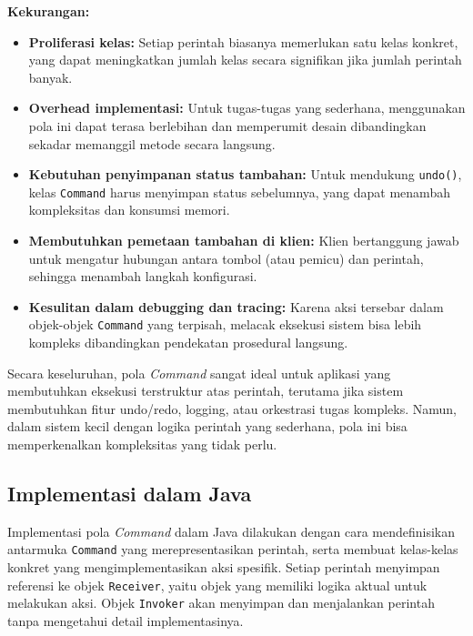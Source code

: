 \textbf{Kekurangan:}
\begin{itemize}
	\item \textbf{Proliferasi kelas:} Setiap perintah biasanya memerlukan satu kelas konkret, yang dapat meningkatkan jumlah kelas secara signifikan jika jumlah perintah banyak.
	
	\item \textbf{Overhead implementasi:} Untuk tugas-tugas yang sederhana, menggunakan pola ini dapat terasa berlebihan dan memperumit desain dibandingkan sekadar memanggil metode secara langsung.
	
	\item \textbf{Kebutuhan penyimpanan status tambahan:} Untuk mendukung \texttt{undo()}, kelas \texttt{Command} harus menyimpan status sebelumnya, yang dapat menambah kompleksitas dan konsumsi memori.
	
	\item \textbf{Membutuhkan pemetaan tambahan di klien:} Klien bertanggung jawab untuk mengatur hubungan antara tombol (atau pemicu) dan perintah, sehingga menambah langkah konfigurasi.
	
	\item \textbf{Kesulitan dalam debugging dan tracing:} Karena aksi tersebar dalam objek-objek \texttt{Command} yang terpisah, melacak eksekusi sistem bisa lebih kompleks dibandingkan pendekatan prosedural langsung.
\end{itemize}

Secara keseluruhan, pola \textit{Command} sangat ideal untuk aplikasi yang membutuhkan eksekusi terstruktur atas perintah, terutama jika sistem membutuhkan fitur undo/redo, logging, atau orkestrasi tugas kompleks. Namun, dalam sistem kecil dengan logika perintah yang sederhana, pola ini bisa memperkenalkan kompleksitas yang tidak perlu.


\subsection{Implementasi dalam Java}

Implementasi pola \textit{Command} dalam Java dilakukan dengan cara mendefinisikan antarmuka \texttt{Command} yang merepresentasikan perintah, serta membuat kelas-kelas konkret yang mengimplementasikan aksi spesifik. Setiap perintah menyimpan referensi ke objek \texttt{Receiver}, yaitu objek yang memiliki logika aktual untuk melakukan aksi. Objek \texttt{Invoker} akan menyimpan dan menjalankan perintah tanpa mengetahui detail implementasinya.

